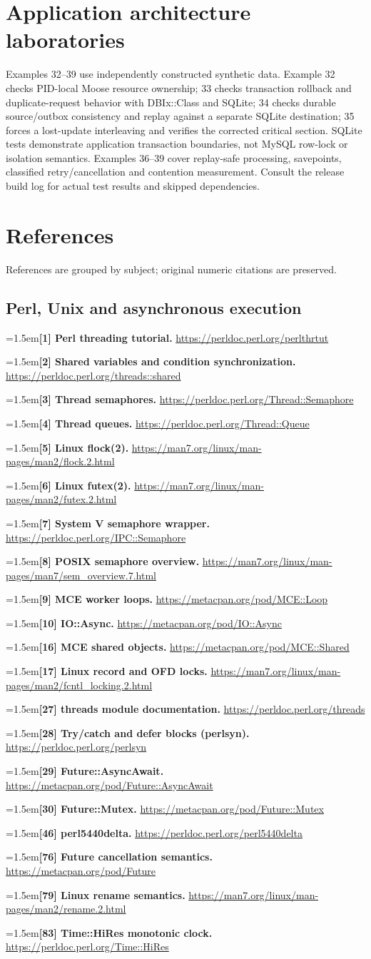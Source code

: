 \documentclass[11pt,openany]{book}
\newcommand{\refdoc}[2]{\par\hangindent=1.5em\hangafter=1\textbf{#1.} \url{#2}\par}
\begin{document}
\section{Application architecture laboratories}
Examples 32--39 use independently constructed synthetic data. Example 32 checks PID-local Moose resource ownership; 33 checks transaction rollback and duplicate-request behavior with DBIx::Class and SQLite; 34 checks durable source/outbox consistency and replay against a separate SQLite destination; 35 forces a lost-update interleaving and verifies the corrected critical section. SQLite tests demonstrate application transaction boundaries, not MySQL row-lock or isolation semantics. Examples 36--39 cover replay-safe processing, savepoints, classified retry/cancellation and contention measurement. Consult the release build log for actual test results and skipped dependencies.

\section{References}
\begingroup\small\setlength{\parskip}{2pt}
References are grouped by subject; original numeric citations are preserved.
\subsection{Perl, Unix and asynchronous execution}
\refdoc{[1] Perl threading tutorial}{https://perldoc.perl.org/perlthrtut}
\refdoc{[2] Shared variables and condition synchronization}{https://perldoc.perl.org/threads::shared}
\refdoc{[3] Thread semaphores}{https://perldoc.perl.org/Thread::Semaphore}
\refdoc{[4] Thread queues}{https://perldoc.perl.org/Thread::Queue}
\refdoc{[5] Linux flock(2)}{https://man7.org/linux/man-pages/man2/flock.2.html}
\refdoc{[6] Linux futex(2)}{https://man7.org/linux/man-pages/man2/futex.2.html}
\refdoc{[7] System V semaphore wrapper}{https://perldoc.perl.org/IPC::Semaphore}
\refdoc{[8] POSIX semaphore overview}{https://man7.org/linux/man-pages/man7/sem_overview.7.html}
\refdoc{[9] MCE worker loops}{https://metacpan.org/pod/MCE::Loop}
\refdoc{[10] IO::Async}{https://metacpan.org/pod/IO::Async}
\refdoc{[16] MCE shared objects}{https://metacpan.org/pod/MCE::Shared}
\refdoc{[17] Linux record and OFD locks}{https://man7.org/linux/man-pages/man2/fcntl_locking.2.html}
\refdoc{[27] threads module documentation}{https://perldoc.perl.org/threads}
\refdoc{[28] Try/catch and defer blocks (perlsyn)}{https://perldoc.perl.org/perlsyn}
\refdoc{[29] Future::AsyncAwait}{https://metacpan.org/pod/Future::AsyncAwait}
\refdoc{[30] Future::Mutex}{https://metacpan.org/pod/Future::Mutex}
\refdoc{[46] perl5440delta}{https://perldoc.perl.org/perl5440delta}
\refdoc{[76] Future cancellation semantics}{https://metacpan.org/pod/Future}
\refdoc{[79] Linux rename semantics}{https://man7.org/linux/man-pages/man2/rename.2.html}
\refdoc{[83] Time::HiRes monotonic clock}{https://perldoc.perl.org/Time::HiRes}
\end{document}
